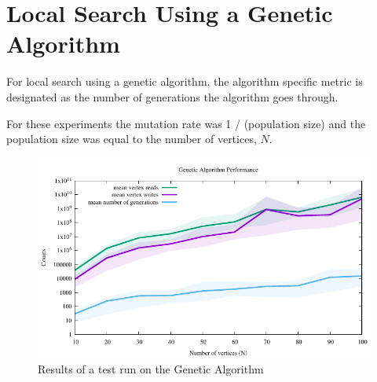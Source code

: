 \documentclass{article}
\begin{document}
\begin{multicols}{2}
\begin{figure}[H]
\end{figure}

\section{Local Search Using a Genetic Algorithm}
For local search using a genetic algorithm, the algorithm specific metric is designated as the number of generations the algorithm goes through. \par For these experiments the mutation rate was 1 / (population size) and the population size was equal to the number of vertices, $N$.
\begin{figure}[H]
	\centering
	\includegraphics[width=\linewidth]{../results/genetic/genetic_performance}
	\caption{Results of a test run on the Genetic Algorithm}
\end{figure}



\end{multicols}
\end{document}

